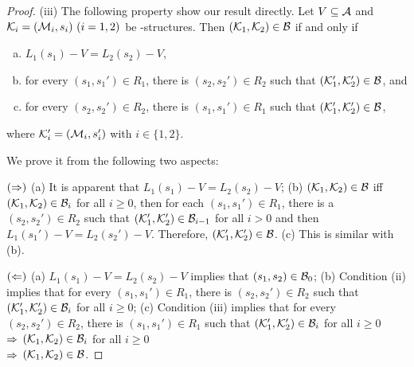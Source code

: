 \documentclass{article}
\begin{document}
\begin{proof}
(iii)
The following property show our result directly.
Let $V\subseteq\cal A$
and ${\cal K}_i=({\cal M}_i,s_i)~(i=1,2)$ be \MPK-structures.
Then $({\cal K}_1,{\cal K}_2)\in\cal B$ if and only if
  \begin{enumerate}[(a)]
    \item $L_1(s_1)- V = L_2(s_2)- V$,
    \item for every $(s_1,s_1')\in R_1$, there is $(s_2,s_2')\in R_2$
    such that $({\cal K}_1',{\cal K}_2')\in {\cal B}$, and
    \item for every $(s_2,s_2')\in R_2$, there is $(s_1,s_1')\in R_1$
    such that $({\cal K}_1',{\cal K}_2')\in {\cal B}$,
   \end{enumerate}
 where ${\cal K}_i'=({\cal M}_i,s_i')$ with $i\in\{1,2\}$.

 We prove it from the following two aspects:

 $(\Rightarrow)$
(a) It is apparent that $L_1(s_1)- V = L_2(s_2)- V$;
(b) %
$({\cal K}_1, {\cal K}_2) \in {\cal B}$ iff $({\cal K}_1, {\cal K}_2) \in {\cal B}_i$ for all $i \geq 0$, then for each $(s_1, s_1') \in R_1$, there is a $(s_2, s_2')\in R_2$  such that  $({\cal K}_1', {\cal K}_2') \in {\cal B}_{i-1}$ for all $i > 0$ and then $L_1(s_1')- V = L_2(s_2')- V$. Therefore, $({\cal K}_1', {\cal K}_2') \in {\cal B}$.
(c) %
 This is similar with (b).

$(\Leftarrow)$ (a) $L_1(s_1)- V = L_2(s_2)- V$ implies that $(s_1, s_2) \in {\cal B}_0$;
(b) Condition (ii) implies that for every $(s_1,s_1')\in R_1$, there is $(s_2,s_2')\in R_2$
    such that $({\cal K}_1',{\cal K}_2')\in {\cal B}_i$ for all $i \geq 0$;
(c) Condition (iii) implies that for every $(s_2,s_2')\in R_2$, there is $(s_1,s_1')\in R_1$
    such that $({\cal K}_1',{\cal K}_2')\in {\cal B}_i$ for all $i \geq 0$\\
$\Rightarrow$ $({\cal K}_1, {\cal K}_2) \in {\cal B}_i$ for all $i \geq 0$\\
$\Rightarrow$ $({\cal K}_1,{\cal K}_2)\in\cal B$.



\end{proof}
\end{document}
